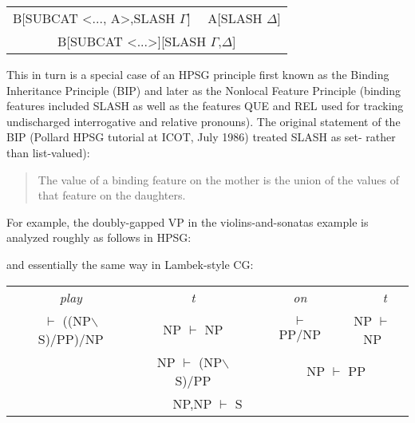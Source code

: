 \documentclass[output=paper]{langsci/langscibook}
\begin{document}
\begin{center}
\begin{tabular}{c}
B[SUBCAT <..., A>,SLASH $\Gamma$] \ \ A[SLASH $\Delta$] \\ \cline{1-1}
B[SUBCAT <...>][SLASH $\Gamma$,$\Delta$]
\end{tabular}
\end{center}

This in turn is a special case of an HPSG principle first known as the Binding Inheritance Principle (BIP) and later as the Nonlocal Feature Principle (binding features included SLASH as well as the features QUE
and REL used for tracking undischarged interrogative and relative pronouns). The original statement of the BIP (Pollard HPSG tutorial at ICOT, July 1986) treated SLASH as set- rather than list-valued):

\begin{quote}
The value of a binding feature on the mother is the union of the values of that feature on the daughters.
\end{quote}

\noindent
For example, the doubly-gapped VP in the violins-and-sonatas example is analyzed roughly  as follows in HPSG:

\begin{center}
\begin{footnotesize}
\qobitree
\end{footnotesize}
\end{center}

\noindent
and essentially the same way in Lambek-style CG:

\begin{center}
\begin{tabular}{ccccccc}
\multicolumn{2}{c}{\em play} & {\em t} & & {\em on} & \ \ \ \ \ \ {\em t} & \\
\multicolumn{2}{c}{$\vdash$ ((NP$\backslash$S)/PP)/NP} & NP $\vdash$ NP & & $\vdash$ PP/NP & \multicolumn{2}{c}{NP $\vdash$ NP} \\ \cline{1-3} \cline{5-7}
 & \multicolumn{2}{c}{NP $\vdash$ (NP$\backslash$S)/PP} & & \multicolumn{3}{c}{NP $\vdash$ PP} \\ \cline{2-6}
\multicolumn{7}{c}{NP,NP $\vdash$ S}
\end{tabular}
\end{center}
\end{document}
